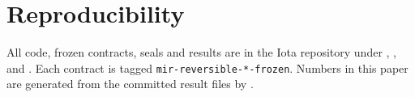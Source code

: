 \section*{Reproducibility}
All code, frozen contracts, seals and results are in the Iota repository under
, , and
. Each contract is tagged
\texttt{mir-reversible-*-frozen}. Numbers in this paper are generated from the committed result files
by .
